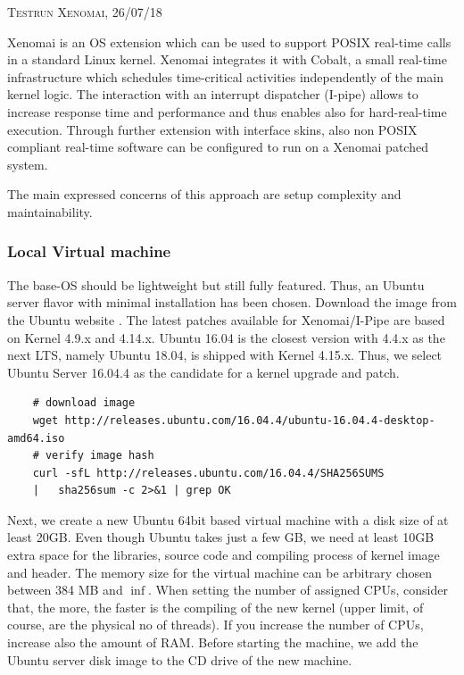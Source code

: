 \documentclass[]{scrartcl}
\begin{document}
{\small\textsc{Testrun Xenomai, 26/07/18} \bigskip}

Xenomai is an OS extension which can be used to support POSIX real-time calls in a standard Linux kernel. 
Xenomai integrates it with Cobalt, a small real-time infrastructure which schedules time-critical activities independently of the main kernel logic. 
The interaction with an interrupt dispatcher (I-pipe) allows to increase response time and performance and thus enables also for hard-real-time execution. 
Through further extension with interface skins, also non POSIX compliant real-time software can be configured to run on a Xenomai patched system.

The main expressed concerns of this approach are setup complexity and maintainability.

\subsubsection{Local Virtual machine}
\label{sec:xenoinst}

The base-OS should be lightweight but still fully featured. Thus, an Ubuntu server flavor with minimal installation has been chosen. 
Download the image from the Ubuntu website \cite{ubuntu02}. The latest patches available for Xenomai/I-Pipe are based on Kernel 4.9.x and 4.14.x. Ubuntu 16.04 is the closest version with 4.4.x as the next LTS, namely Ubuntu 18.04, is shipped with Kernel 4.15.x. 
Thus, we select Ubuntu Server 16.04.4 as the candidate for a kernel upgrade and patch.

\begin{verbatim}
	# download image
	wget http://releases.ubuntu.com/16.04.4/ubuntu-16.04.4-desktop-amd64.iso
	# verify image hash
	curl -sfL http://releases.ubuntu.com/16.04.4/SHA256SUMS
	|	sha256sum -c 2>&1 | grep OK
\end{verbatim}

Next, we create a new Ubuntu 64bit based virtual machine with a disk size of at least 20GB. 
Even though Ubuntu takes just a few GB, we need at least 10GB extra space for the libraries, source code and compiling process of kernel image and header. 
The memory size for the virtual machine can be arbitrary chosen between 384 MB and $\inf$. When setting the number of assigned CPUs, consider that, the more, the faster is the compiling of the new kernel (upper limit, of course, are the physical no of threads). 
If you increase the number of CPUs, increase also the amount of RAM.
Before starting the machine, we add the Ubuntu server disk image to the CD drive of the new machine.
\end{document}

